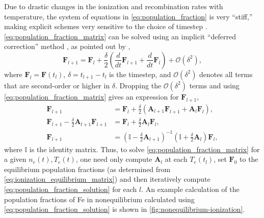 Due to drastic changes in the ionization and recombination rates with temperature, the system of equations in \autoref{eq:population_fraction} is very ``stiff,'' making explicit schemes very sensitive to the choice of timestep \citep{macneice_numerical_1984,bradshaw_numerical_2009}. \autoref{eq:population_fraction_matrix} can be solved using an implicit ``deferred correction'' method \citep{npl_modern_1961}, as pointed out by \citet{macneice_numerical_1984},
\begin{equation}\label{eq:deferred_correction}
    \mathbf{F}_{l+1} = \mathbf{F}_{l} + \frac{\delta}{2}\left(\frac{d}{dt}\mathbf{F}_{l+1} + \frac{d}{dt}\mathbf{F}_l\right) + \mathcal{O}(\delta^2),
\end{equation}
where $\mathbf{F}_l=\mathbf{F}(t_l)$, $\delta = t_{l+1} - t_l$ is the timestep, and $\mathcal{O}(\delta^2)$ denotes all terms that are second-order or higher in $\delta$. Dropping the $\mathcal{O}(\delta^2)$ terms and using \autoref{eq:population_fraction_matrix} gives an expression for $\mathbf{F}_{l+1}$,
\begin{align}\label{eq:population_fraction_solution}
    \mathbf{F}_{l+1} &= \mathbf{F}_{l} + \frac{\delta}{2}\left(\mathbf{A}_{l+1}\mathbf{F}_{l+1} + \mathbf{A}_l\mathbf{F}_l\right), \nonumber \\
    \mathbf{F}_{l+1} - \frac{\delta}{2}\mathbf{A}_{l+1}\mathbf{F}_{l+1} &= \mathbf{F}_{l} + \frac{\delta}{2}\mathbf{A}_l\mathbf{F}_l, \nonumber \\
    \mathbf{F}_{l+1} &= \left(\mathbb{I} - \frac{\delta}{2}\mathbf{A}_{l+1}\right)^{-1}\left(\mathbb{I} + \frac{\delta}{2}\mathbf{A}_l\right)\mathbf{F}_l,
\end{align}
where $\mathbb{I}$ is the identity matrix. Thus, to solve \autoref{eq:population_fraction_matrix} for a given $n_e(t),T_e(t)$, one need only compute $\mathbf{A}_l$ at each $T_e(t_l)$, set $\mathbf{F}_0$ to the equilibrium population fractions (as determined from \autoref{eq:ionization_equilibrium_matrix}) and then iteratively compute \autoref{eq:population_fraction_solution} for each $l$. An example calculation of the population fractions of Fe in nonequilibrium calculated using \autoref{eq:population_fraction_solution} is shown in \autoref{fig:nonequilibrium-ionization}.

